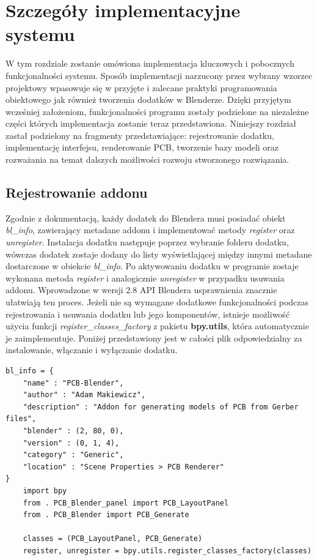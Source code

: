 \documentclass{xmgr}
\begin{document}
\chapter{Szczegóły implementacyjne systemu}
W tym rozdziale zostanie omówiona implementacja kluczowych i pobocznych funkcjonalności systemu. Sposób implementacji narzucony przez wybrany wzorzec projektowy wpasowuje się w przyjęte i zalecane praktyki programowania obiektowego jak również tworzenia dodatków w Blenderze. Dzięki przyjętym wcześniej założeniom, funkcjonalności programu zostały podzielone na niezależne części których implementacja zostanie teraz przedstawiona. Niniejszy rozdział zastał podzielony na fragmenty przedstawiające: rejestrowanie dodatku, implementację interfejsu, renderowanie PCB, tworzenie bazy modeli oraz rozważania na temat dalszych możliwości rozwoju stworzonego rozwiązania.


\section {Rejestrowanie addonu}
Zgodnie z dokumentacją, każdy dodatek do Blendera musi posiadać obiekt \emph{bl\_info}, zawierający metadane addonu i implementować metody \emph{register} oraz \emph{unregister}. Instalacja dodatku następuje poprzez wybranie folderu dodatku, wówczas dodatek zostaje dodany do listy wyświetlającej między innymi metadane dostarczone w obiekcie \emph{bl\_info}. Po aktywowaniu dodatku w programie zostaje wykonana metoda \emph{register} i analogicznie \emph{unregister} w przypadku usuwania addonu. Wprowadzone w wersji 2.8 API Blendera usprawnienia znacznie ułatwiają ten proces. Jeżeli nie są wymagane dodatkowe funkcjonalności podczas rejestrowania i usuwania dodatku lub jego komponentów, istnieje możliwość użycia funkcji \emph{register\_classes\_factory} z pakietu \textbf{bpy.utils}, która automatycznie je zaimplementuje. Poniżej przedstawiony jest w całości plik odpowiedzialny za instalowanie, włączanie i wyłączanie dodatku.

\begin{lstlisting}
bl_info = {
	"name" : "PCB-Blender",
	"author" : "Adam Makiewicz",
	"description" : "Addon for generating models of PCB from Gerber files",
	"blender" : (2, 80, 0),
	"version" : (0, 1, 4),
	"category" : "Generic",
	"location" : "Scene Properties > PCB Renderer"
}
	import bpy
	from . PCB_Blender_panel import PCB_LayoutPanel
	from . PCB_Blender import PCB_Generate

	classes = (PCB_LayoutPanel, PCB_Generate)
	register, unregister = bpy.utils.register_classes_factory(classes)
\end{lstlisting}
\end{document}
